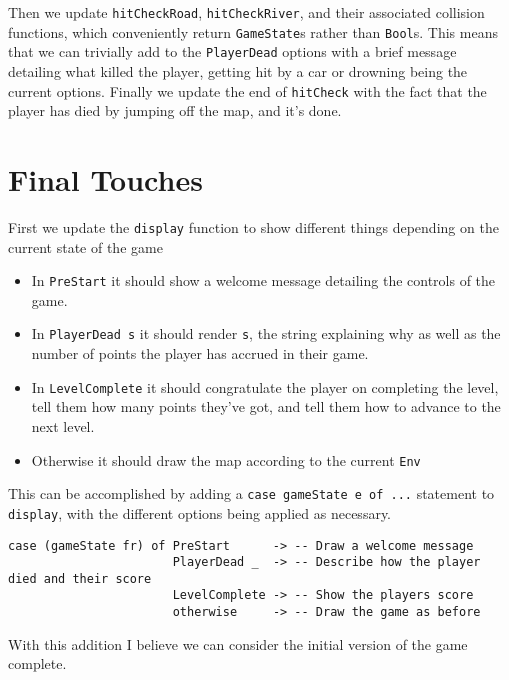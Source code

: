 \documentclass[12pt, a4paper]{report}
\begin{document}
Then we update \verb|hitCheckRoad|, \verb|hitCheckRiver|, and their associated collision functions, which conveniently return \verb|GameState|s rather than \verb|Bool|s.
This means that we can trivially add to the \verb|PlayerDead| options with a brief message detailing what killed the player, getting hit by a car or drowning being the current options.
Finally we update the end of \verb|hitCheck| with the fact that the player has died by jumping off the map, and it's done.

\section{Final Touches}

First we update the \verb|display| function to show different things depending on the current state of the game
\begin{itemize}
  \item In \verb|PreStart| it should show a welcome message detailing the controls of the game.
  \item In \verb|PlayerDead s| it should render \verb|s|, the string explaining why as well as the number of points the player has accrued in their game.
  \item In \verb|LevelComplete| it should congratulate the player on completing the level, tell them how many points they've got, and tell them how to advance to the next level.
  \item Otherwise it should draw the map according to the current \verb|Env|
\end{itemize}

This can be accomplished by adding a \verb|case gameState e of ...| statement to \verb|display|, with the different options being applied as necessary.

\begin{lstlisting}
case (gameState fr) of PreStart      -> -- Draw a welcome message
                       PlayerDead _  -> -- Describe how the player died and their score
                       LevelComplete -> -- Show the players score
                       otherwise     -> -- Draw the game as before
\end{lstlisting}

With this addition I believe we can consider the initial version of the game complete.
\end{document}
